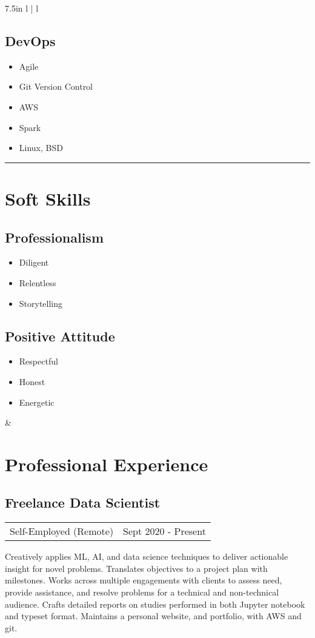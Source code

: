 \documentclass{article}
\begin{document}
\begin{tabular*}{7.5in}{ l | l}
\begin{minipage}[t]{2.0in}
	\subsection*{DevOps}
	\begin{itemize}[noitemsep]
		\item Agile
		\item Git Version Control
		\item AWS
		\item Spark
		\item Linux, BSD
	\end{itemize}
	\hrule
	\section*{Soft Skills}
	\subsection*{Professionalism}
	\begin{itemize}[noitemsep]
		\item Diligent
		\item Relentless
		\item Storytelling
	\end{itemize}
	\subsection*{Positive Attitude}
	\begin{itemize}[noitemsep]
		\item Respectful
		\item Honest
		\item Energetic
	\end{itemize}
	\smallskip
	\end{minipage} &
	
	\begin{minipage}[t]{5.25in}
	\section*{Professional Experience}
	\subsection*{Freelance Data Scientist}
	\begin{tabular*}{\columnwidth}{@{\extracolsep{\fill}}lr}
	Self-Employed (Remote) & Sept 2020 - Present
	\end{tabular*}
	Creatively applies ML, AI, and data science techniques to deliver actionable insight for novel problems.
	Translates objectives to a project plan with milestones.
	Works across multiple engagements with clients to assess need, provide assistance, and resolve problems for a technical and non-technical audience.
	Crafts detailed reports on studies performed in both Jupyter notebook and typeset format.
	Maintains a personal website, and portfolio, with AWS and git.
	\medskip

\end{minipage}
\end{tabular*}
\end{document}
